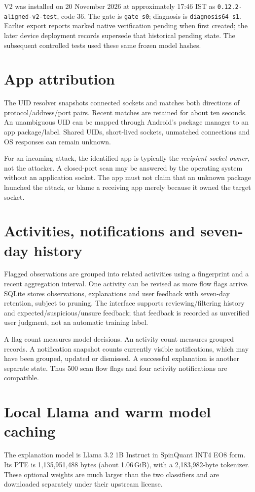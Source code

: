 \documentclass[11pt,a4paper,oneside]{report}
\newcommand{\code}[1]{\nolinkurl{#1}}
\begin{document}
V2 was installed on 20 November 2026 at approximately 17:46 IST as \code{0.12.2-aligned-v2-test}, code 36. The gate is \code{gate_s0}; diagnosis is \code{diagnosis64_s1}. Earlier export reports marked native verification pending when first created; the later device deployment records supersede that historical pending state. The subsequent controlled tests used these same frozen model hashes.

\section{App attribution}
The UID resolver snapshots connected sockets and matches both directions of protocol/address/port pairs. Recent matches are retained for about ten seconds. An unambiguous UID can be mapped through Android's package manager to an app package/label. Shared UIDs, short-lived sockets, unmatched connections and OS responses can remain unknown.

For an incoming attack, the identified app is typically the \emph{recipient socket owner}, not the attacker. A closed-port scan may be answered by the operating system without an application socket. The app must not claim that an unknown package launched the attack, or blame a receiving app merely because it owned the target socket.

\section{Activities, notifications and seven-day history}
Flagged observations are grouped into related activities using a fingerprint and a recent aggregation interval. One activity can be revised as more flow flags arrive. SQLite stores observations, explanations and user feedback with seven-day retention, subject to pruning. The interface supports reviewing/filtering history and expected/suspicious/unsure feedback; that feedback is recorded as unverified user judgment, not an automatic training label.

A flag count measures model decisions. An activity count measures grouped records. A notification snapshot counts currently visible notifications, which may have been grouped, updated or dismissed. A successful explanation is another separate state. Thus 500 scan flow flags and four activity notifications are compatible.

\section{Local Llama and warm model caching}
The explanation model is Llama 3.2 1B Instruct in SpinQuant INT4 EO8 form. Its PTE is 1,135,951,488 bytes (about 1.06\,GiB), with a 2,183,982-byte tokenizer. These optional weights are much larger than the two classifiers and are downloaded separately under their upstream license.
\end{document}

